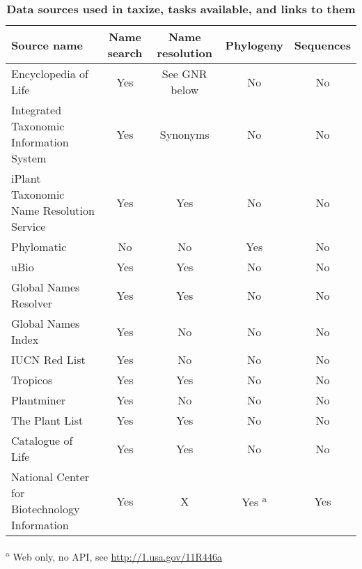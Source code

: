 \documentclass[10pt]{article}\usepackage{graphicx, color}
\begin{document}
\begin{table}[!ht]
\caption{
\bf{Data sources used in taxize, tasks available, and links to them}}
\begin{tabular}{|l|c|c|c|c|}
\hline
Source name & Name search & Name resolution & Phylogeny & Sequences  \\
\hline
Encyclopedia of Life \cite{eol} & Yes & See GNR below & No & No \\
Integrated Taxonomic Information System \cite{itis} & Yes & Synonyms & No & No \\
iPlant Taxonomic Name Resolution Service \cite{tnrs} & Yes & Yes & No & No \\
Phylomatic \cite{webb2005} & No & No & Yes & No \\
uBio \cite{ubio} & Yes & Yes & No & No \\
Global Names Resolver \cite{eolgnr} & Yes & Yes & No & No \\
Global Names Index \cite{eolgnr} & Yes & No & No & No \\
IUCN Red List \cite{iucn} & Yes & No & No & No \\
Tropicos \cite{tropicos} & Yes & Yes & No & No \\
Plantminer \cite{carvalho2010plantminer} & Yes & No & No & No \\
The Plant List & Yes & Yes & No & No \\
Catalogue of Life \cite{col} & Yes & Yes & No & No \\
National Center for Biotechnology Information \cite{ncbi} & Yes & X & Yes \textsuperscript{a} & Yes \\
\hline
\end{tabular}
\begin{flushleft}\textsuperscript{a} Web only, no API, see \url{http://1.usa.gov/11R446a}
\end{flushleft}
\label{tab:a}
\end{table}
\end{document}
